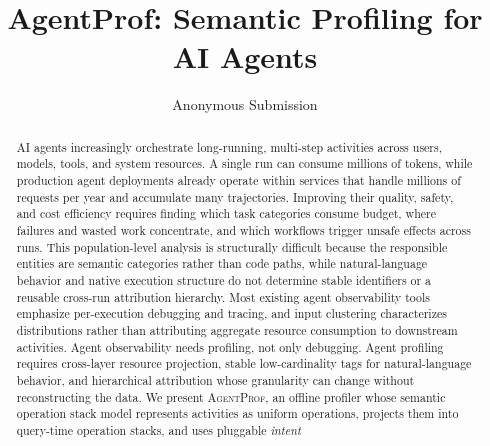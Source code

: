 \documentclass[letterpaper]{article}
\newcommand{\sys}{\textsc{AgentProf}\xspace}
\begin{document}
\title{AgentProf: Semantic Profiling for AI Agents}
\author{Anonymous Submission}
\affiliations{}

\maketitle

\begin{abstract}
AI agents increasingly orchestrate long-running, multi-step activities
across users, models, tools, and system resources. A single run can consume
millions of tokens, while production agent deployments already operate within
services that handle millions of requests per year and accumulate many trajectories.
Improving their quality, safety, and cost efficiency requires finding
which task categories consume budget, where failures and wasted work
concentrate, and which workflows trigger unsafe effects across runs.
This population-level analysis is structurally difficult because the
responsible entities are semantic categories rather than code paths,
while natural-language behavior and native execution structure do not
determine stable identifiers or a reusable cross-run attribution
hierarchy.
Most existing agent observability tools emphasize per-execution
debugging and tracing, and input clustering characterizes distributions
rather than attributing aggregate resource consumption to downstream
activities.
Agent observability needs profiling, not only debugging.
Agent profiling requires cross-layer resource projection, stable
low-cardinality tags for natural-language behavior, and hierarchical
attribution whose granularity can change without reconstructing the
data.
We present \sys, an offline profiler whose semantic operation stack
model represents activities as uniform operations, projects them into
query-time operation stacks, and uses pluggable \emph{intent
}
\end{abstract}
\end{document}
